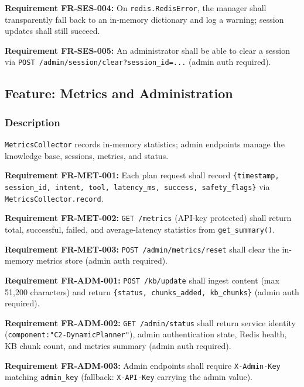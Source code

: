 \documentclass[10pt,journal,onecolumn]{IEEEtran}
\newcommand{\reqid}[1]{\textbf{#1}}
\begin{document}
\reqid{Requirement FR-SES-004:} On \texttt{redis.RedisError}, the manager shall transparently fall back to an in-memory dictionary and log a warning; session updates shall still succeed.

\reqid{Requirement FR-SES-005:} An administrator shall be able to clear a session via \texttt{POST /\allowbreak admin/\allowbreak session/\allowbreak clear?session\_\allowbreak id=.\allowbreak .\allowbreak .\allowbreak } (admin auth required).

\subsection{Feature: Metrics and Administration}

\subsubsection{Description}

\texttt{MetricsCollector} records in-memory statistics; admin endpoints manage the knowledge base, sessions, metrics, and status.

\reqid{Requirement FR-MET-001:} Each plan request shall record \texttt{\{timestamp, session\_\allowbreak id, intent, tool, latency\_\allowbreak ms, success, safety\_\allowbreak flags\}} via \texttt{MetricsCollector.record}.

\reqid{Requirement FR-MET-002:} \texttt{GET /metrics} (API-key protected) shall return total, successful, failed, and average-latency statistics from \texttt{get\_summary()}.

\reqid{Requirement FR-MET-003:} \texttt{POST /\allowbreak admin/\allowbreak metrics/\allowbreak reset} shall clear the in-memory metrics store (admin auth required).

\reqid{Requirement FR-ADM-001:} \texttt{POST /kb/update} shall ingest content (max 51,200 characters) and return \texttt{\{status, chunks\_\allowbreak added, kb\_\allowbreak chunks\}} (admin auth required).

\reqid{Requirement FR-ADM-002:} \texttt{GET /admin/status} shall return service identity (\texttt{component:\allowbreak "C2-\allowbreak DynamicPlanner"}), admin authentication state, Redis health, KB chunk count, and metrics summary (admin auth required).

\reqid{Requirement FR-ADM-003:} Admin endpoints shall require \texttt{X-Admin-Key} matching \texttt{admin\_key} (fallback: \texttt{X-API-Key} carrying the admin value).
\end{document}
